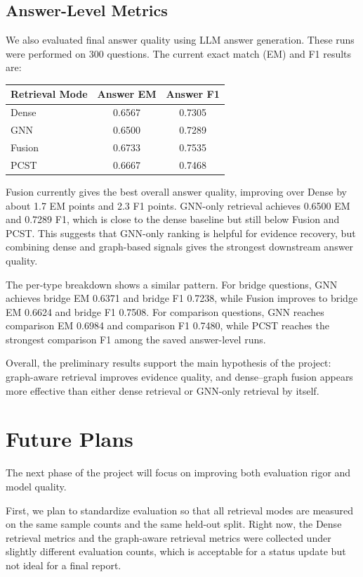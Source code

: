 \documentclass[10pt]{article}
\begin{document}
\subsection{Answer-Level Metrics}

We also evaluated final answer quality using LLM answer generation. These runs were performed on 300 questions. The current exact match (EM) and F1 results are:

\begin{center}
\begin{tabular}{lcc}
\toprule
\textbf{Retrieval Mode} & \textbf{Answer EM} & \textbf{Answer F1} \\
\midrule
Dense & 0.6567 & 0.7305 \\
GNN & 0.6500 & 0.7289 \\
Fusion & 0.6733 & 0.7535 \\
PCST & 0.6667 & 0.7468 \\
\bottomrule
\end{tabular}
\end{center}

Fusion currently gives the best overall answer quality, improving over Dense by about 1.7 EM points and 2.3 F1 points. GNN-only retrieval achieves 0.6500 EM and 0.7289 F1, which is close to the dense baseline but still below Fusion and PCST. This suggests that GNN-only ranking is helpful for evidence recovery, but combining dense and graph-based signals gives the strongest downstream answer quality.

The per-type breakdown shows a similar pattern. For bridge questions, GNN achieves bridge EM 0.6371 and bridge F1 0.7238, while Fusion improves to bridge EM 0.6624 and bridge F1 0.7508. For comparison questions, GNN reaches comparison EM 0.6984 and comparison F1 0.7480, while PCST reaches the strongest comparison F1 among the saved answer-level runs.

Overall, the preliminary results support the main hypothesis of the project: graph-aware retrieval improves evidence quality, and dense--graph fusion appears more effective than either dense retrieval or GNN-only retrieval by itself.

\section{Future Plans}

The next phase of the project will focus on improving both evaluation rigor and model quality.

First, we plan to standardize evaluation so that all retrieval modes are measured on the same sample counts and the same held-out split. Right now, the Dense retrieval metrics and the graph-aware retrieval metrics were collected under slightly different evaluation counts, which is acceptable for a status update but not ideal for a final report.
\end{document}
